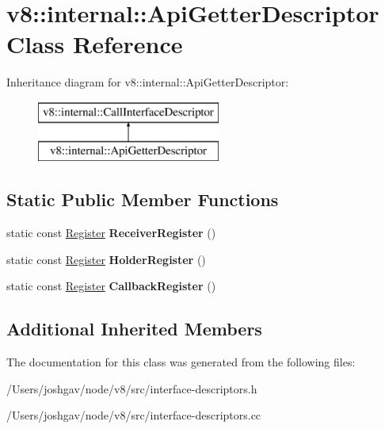 \hypertarget{classv8_1_1internal_1_1_api_getter_descriptor}{}\section{v8\+:\+:internal\+:\+:Api\+Getter\+Descriptor Class Reference}
\label{classv8_1_1internal_1_1_api_getter_descriptor}
Inheritance diagram for v8\+:\+:internal\+:\+:Api\+Getter\+Descriptor\+:\begin{figure}[H]
\begin{center}
\leavevmode
\includegraphics[height=2.000000cm]{classv8_1_1internal_1_1_api_getter_descriptor}
\end{center}
\end{figure}
\subsection*{Static Public Member Functions}
\begin{DoxyCompactItemize}
\item 
static const \hyperlink{structv8_1_1internal_1_1_register}{Register} {\bfseries Receiver\+Register} ()\hypertarget{classv8_1_1internal_1_1_api_getter_descriptor_aca30c34699283e5f463df6b7ffb7bcf1}{}\label{classv8_1_1internal_1_1_api_getter_descriptor_aca30c34699283e5f463df6b7ffb7bcf1}

\item 
static const \hyperlink{structv8_1_1internal_1_1_register}{Register} {\bfseries Holder\+Register} ()\hypertarget{classv8_1_1internal_1_1_api_getter_descriptor_a3a2ad818edc83502718c466b5dad01b5}{}\label{classv8_1_1internal_1_1_api_getter_descriptor_a3a2ad818edc83502718c466b5dad01b5}

\item 
static const \hyperlink{structv8_1_1internal_1_1_register}{Register} {\bfseries Callback\+Register} ()\hypertarget{classv8_1_1internal_1_1_api_getter_descriptor_a1289ae62e1bf71022cdedd9d84ca1082}{}\label{classv8_1_1internal_1_1_api_getter_descriptor_a1289ae62e1bf71022cdedd9d84ca1082}

\end{DoxyCompactItemize}
\subsection*{Additional Inherited Members}


The documentation for this class was generated from the following files\+:\begin{DoxyCompactItemize}
\item 
/\+Users/joshgav/node/v8/src/interface-\/descriptors.\+h\item 
/\+Users/joshgav/node/v8/src/interface-\/descriptors.\+cc\end{DoxyCompactItemize}
